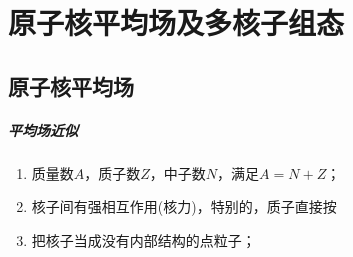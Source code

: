 \chapter{原子核平均场及多核子组态}

\section{原子核平均场}
\paragraph*{平均场近似}
\begin{enumerate}
	\item 质量数$A$，质子数$Z$，中子数$N$，满足$A=N+Z$；
	\item 核子间有强相互作用(核力)，特别的，质子直接按
	\item 把核子当成没有内部结构的点粒子；
\end{enumerate}

